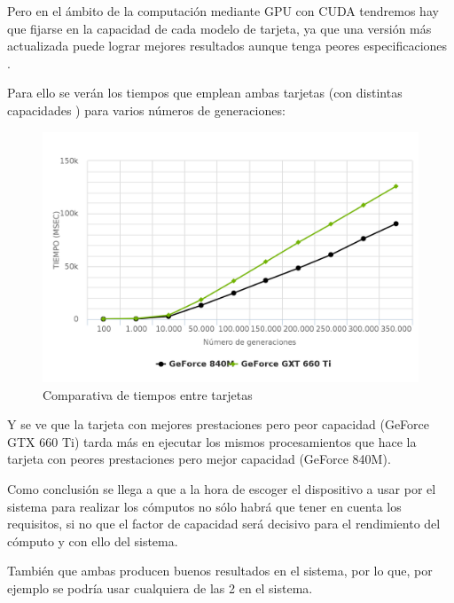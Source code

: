 \newpage %
Pero en el ámbito de la computación mediante GPU con CUDA tendremos hay que fijarse en la capacidad de cada modelo de tarjeta, ya que una versión más actualizada puede lograr mejores resultados aunque tenga peores especificaciones \cite{capacidadescuda}.

\bigskip
Para ello se verán los tiempos que emplean ambas tarjetas (con distintas capacidades \cite{capacidades}) para varios números de generaciones:

\bigskip
\begin{figure}[h]
	\centering
	\includegraphics[width=0.9\linewidth]{../images/grafico_tiempos}
	\caption[Comparativa de tiempos entre tarjetas]{Comparativa de tiempos entre tarjetas}
	\label{fig:grafico_tiempos}
\end{figure}

\bigskip
Y se ve que la tarjeta con mejores prestaciones pero peor capacidad (GeForce GTX 660 Ti) tarda más en ejecutar los mismos procesamientos que hace la tarjeta con peores prestaciones pero mejor capacidad (GeForce 840M).

\bigskip
Como conclusión se llega a que a la hora de escoger el dispositivo a usar por el sistema para realizar los cómputos no sólo habrá que tener en cuenta los requisitos, si no que el factor de capacidad será decisivo para el rendimiento del cómputo y con ello del sistema.

También que ambas producen buenos resultados en el sistema, por lo que, por ejemplo se podría usar cualquiera de las 2 en el sistema.

